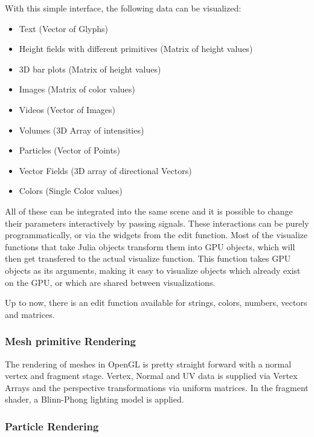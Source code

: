 With this simple interface, the following data can be visualized:

\begin{itemize}
    \item Text (Vector of Glyphs)
    \item Height fields with different primitives (Matrix of height values)
    \item 3D bar plots (Matrix of height values)
    \item Images (Matrix of color values)
    \item Videos (Vector of Images)
    \item Volumes (3D Array of intensities)
    \item Particles (Vector of Points)
    \item Vector Fields (3D array of directional Vectors)
    \item Colors (Single Color values)
\end{itemize}

All of these can be integrated into the same scene and it is possible to change their parameters interactively by passing signals.
These interactions can be purely programmatically, or via the widgets from the edit function.
Most of the visualize functions that take Julia objects transform them into GPU objects, which will then get transfered to the actual visualize function. This function takes GPU objects as its arguments, making it easy to visualize objects which already exist on the GPU, or which are shared between visualizations.

Up to now, there is an edit function available for strings, colors, numbers, vectors and matrices.


\subsubsection{Mesh primitive Rendering}

The rendering of meshes in OpenGL is pretty straight forward with a normal vertex and fragment stage.
Vertex, Normal and UV data is supplied via Vertex Arrays and the perspective transformations via uniform matrices.
In the fragment shader, a Blinn-Phong lighting model is applied.

\subsubsection{Particle Rendering}

